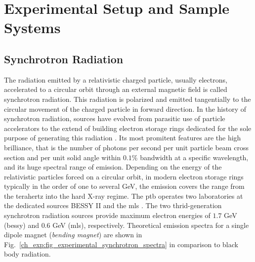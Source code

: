 \chapter{Experimental Setup and Sample Systems} \label{ch_exp}

\section{Synchrotron Radiation}
The radiation emitted by a relativistic charged particle, usually electrons, accelerated to a circular orbit through an external magnetic field is called synchrotron radiation. This radiation is polarized and emitted tangentially to the circular movement of the charged particle in forward direction. In the history of synchrotron radiation, sources have evolved from parasitic use of particle accelerators to the extend of building electron storage rings dedicated for the sole purpose of generating this radiation \cite{munro_chapter_1987}. Its most promitent features are the high brilliance, that is the number of photons per second per unit particle beam cross section and per unit solid angle within $0.1\%$ bandwidth at a specific wavelength, and its huge spectral range of emission. Depending on the energy of the relativistic particles forced on a circular orbit, in modern electron storage rings typically in the order of one to several GeV, the emission covers the range from the terahertz into the hard X-ray regime. The \gls{ptb} operates two laboratories at the dedicated sources BESSY II and the \gls{mls} \cite{brandt_metrology_2007}. The two thrid-generation synchrotron radiation sources provide maximum electron energies of $1.7$ GeV (\gls{bessy}) and $0.6$ GeV (\gls{mls}), respectively. Theoretical emission spectra for a single dipole magnet (\emph{bending magnet}) are shown in Fig.~\ref{ch_exp:fig_experimental_synchrotron_spectra} in comparison to black body radiation.
